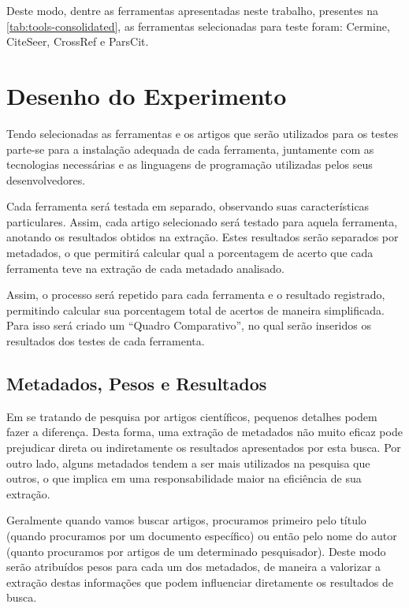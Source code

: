 Deste modo, dentre as ferramentas apresentadas neste trabalho, presentes na \autoref{tab:tools-consolidated}, as ferramentas selecionadas para teste foram: Cermine, CiteSeer, CrossRef e ParsCit.
    

\section{Desenho do Experimento}
\label{sec:experiment-design}

Tendo selecionadas as ferramentas e os artigos que serão utilizados para os testes parte-se para a instalação adequada de cada ferramenta, juntamente com as tecnologias necessárias e as linguagens de programação utilizadas pelos seus desenvolvedores. 

Cada ferramenta será testada em separado, observando suas características particulares. Assim, cada artigo selecionado será testado para aquela ferramenta, anotando os resultados obtidos na extração. Estes resultados serão separados por metadados, o que permitirá calcular qual a porcentagem de acerto que cada ferramenta teve na extração de cada metadado analisado.

Assim, o processo será repetido para cada ferramenta e o resultado registrado, permitindo calcular sua porcentagem total de acertos de maneira simplificada. Para isso será criado um ``Quadro Comparativo'', no qual serão inseridos os resultados dos testes de cada ferramenta. 

\subsection{Metadados, Pesos e Resultados}
\label{ssec:metadata-results}


Em se tratando de pesquisa por artigos científicos, pequenos detalhes podem fazer a diferença. Desta forma, uma extração de metadados não muito eficaz pode prejudicar direta ou indiretamente os resultados apresentados por esta busca. Por outro lado, alguns metadados tendem a ser mais utilizados na pesquisa que outros, o que implica em uma responsabilidade maior na eficiência de sua extração. 


Geralmente quando vamos buscar artigos, procuramos primeiro pelo título (quando procuramos por um documento específico) ou então pelo nome do autor (quanto procuramos por artigos de um determinado pesquisador). Deste modo serão atribuídos pesos para cada um dos metadados, de maneira a valorizar a extração destas informações que podem influenciar diretamente os resultados de busca.

